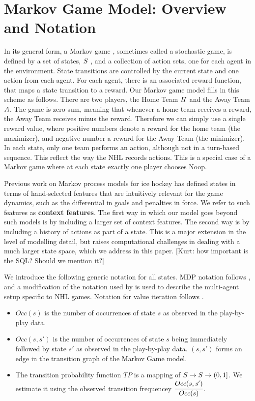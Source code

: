 \documentclass[]{article}
\begin{document}
\section{Markov Game Model: Overview and Notation}
In its general form, a Markov game \cite{Littman}, sometimes called a
stochastic game, is defined by a set of states, $S$ , and a collection of action sets, one for each agent in the environment. State transitions are controlled
by the current state and one action from each agent. For each agent, there is an associated reward function, that maps a state transition to a reward. Our Markov game model fills in this scheme as follows. There are two players, the Home Team $H$ and the Away Team $A$. The game is zero-sum, meaning that whenever a home team receives a reward, the Away Team receives minus the reward. Therefore we can simply use a single reward value, where positive numbers denote a reward for the home team (the maximizer), and negative number a reward for the Away Team (the minimizer). In each state, only one team performs an action, although not in a turn-based sequence. This reflect the way the NHL records actions. This is a special case of a Markov game where at each state exactly one player chooses Noop. 


Previous work on Markov process models for ice hockey \cite{thomas} has defined states in terms of hand-selected features that are intuitively relevant for the game dynamics, such as the differential in goals and  penalties in force. We refer to such features as \textbf{context features}. The first way in which our model goes beyond such models is by including a larger set of context features. The second way is by including a history of actions as part of a state. This is a major extension in the level of modelling detail, but raises computational challenges in dealing with a much larger state space, which we address in this paper.
[Kurt: how important is the SQL? Should we mention it?] 

We introduce the following generic notation for all states. MDP notation follows \citep{Russell2010}, and a modification of the notation used by \citep{Littman1994} is used to describe the multi-agent setup specific to NHL games. Notation for value iteration follows \citep{Mitchell1997}. 

\begin{itemize}
\item $Occ(s)$ is the number of occurrences of state $s$ as observed in the play-by-play data.
\item $Occ(s,s')$ is the number of occurrences of state $s$ being immediately followed by state $s'$ as observed in the play-by-play data. $(s,s')$ forms an edge in the transition graph of the Markov Game model.
\item The transition probability function $TP$ is a mapping of $S \rightarrow S \rightarrow (0,1]$. We estimate it using the observed transition frequencey $\cfrac{Occ(s,s')}{Occ(s)}$.
\end{itemize}
\end{document}
